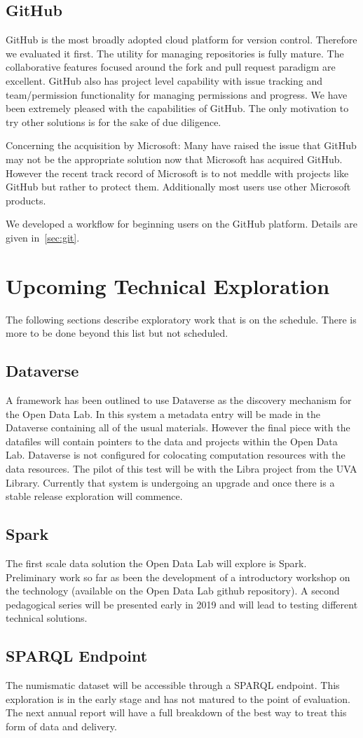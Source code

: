 \subsection{GitHub}
GitHub is the most broadly adopted cloud platform for version control. Therefore we evaluated it first. The utility for managing repositories is fully mature. The collaborative features focused around the fork and pull request paradigm are excellent. GitHub also has project level capability with issue tracking and team/permission functionality for managing permissions and progress. We have been extremely pleased with the capabilities of GitHub. The only motivation to try other solutions is for the sake of due diligence.

Concerning the acquisition by Microsoft: Many have raised the issue that GitHub may not be the appropriate solution now that Microsoft has acquired GitHub. However the recent track record of Microsoft is to not meddle with projects like GitHub but rather to protect them. Additionally most users use other Microsoft products. 

We developed a workflow for beginning users on the GitHub platform. Details are given in~\ref{sec:git}.

\section{Upcoming Technical Exploration}
The following sections describe exploratory work that is on the schedule. There is more to be done beyond this list but not scheduled.
\subsection{Dataverse}
A framework has been outlined to use Dataverse as the discovery mechanism for the Open Data Lab. In this system a metadata entry will be made in the Dataverse containing all of the usual materials. However the final piece with the datafiles will contain pointers to the data and projects within the Open Data Lab. Dataverse is not configured for colocating computation resources with the data resources. The pilot of this test will be with the Libra project from the UVA Library. Currently that system is undergoing an upgrade and once there is a stable release exploration will commence.
\subsection{Spark}
The first scale data solution the Open Data Lab will explore is Spark. Preliminary work so far as been the development of a introductory workshop on the technology (available on the Open Data Lab github repository). A second pedagogical series will be presented early in 2019 and will lead to testing different technical solutions.
\subsection{SPARQL Endpoint}
The numismatic dataset will be accessible through a SPARQL endpoint. This exploration is in the early stage and has not matured to the point of evaluation. The next annual report will have a full breakdown of the best way to treat this form of data and delivery.
